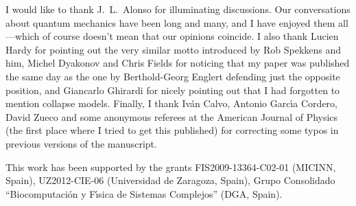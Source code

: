 \documentclass[a4paper,12pt]{article}
\begin{document}
\hspace{0.5cm} I would like to thank J.~L.~Alonso for illuminating
discussions. Our conversations about quantum mechanics have been long and
many, and I have enjoyed them all ---which of course doesn't mean that our
opinions coincide. I also thank Lucien Hardy for pointing out the very similar
motto introduced by Rob Spekkens and him, Michel Dyakonov and Chris Fields for
noticing that my paper was published the same day as the one by Berthold-Georg
Englert defending just the opposite position, and Giancarlo Ghirardi for
nicely pointing out that I had forgotten to mention collapse models. Finally,
I thank Iv\'an Calvo, Antonio Garc\'{\i}a Cordero, David Zueco and some
anonymous referees at the American Journal of Physics (the first place where I
tried to get this published) for correcting some typos in previous versions of
the manuscript.

This work has been supported by the grants FIS2009-13364-C02-01 (MICINN,
Spain), UZ2012-CIE-06 (Universidad de Zaragoza, Spain), Grupo Consolidado
``Biocomputaci\'on y F\'{\i}sica de Sistemas Complejos'' (DGA, Spain).


%
\end{document}

